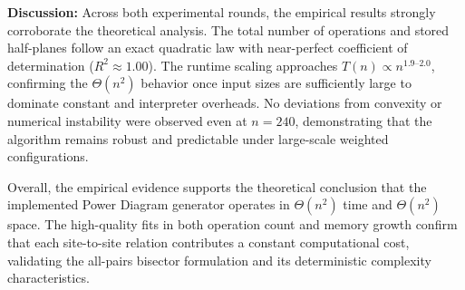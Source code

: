 \documentclass{article}
\begin{document}
\textbf{Discussion:}
Across both experimental rounds, the empirical results strongly corroborate the theoretical analysis.  
The total number of operations and stored half-planes follow an exact quadratic law with near-perfect coefficient of determination ($R^2\!\approx\!1.00$).  
The runtime scaling approaches $T(n)\!\propto\!n^{1.9\text{–}2.0}$, confirming the $\Theta(n^2)$ behavior once input sizes are sufficiently large to dominate constant and interpreter overheads.  
No deviations from convexity or numerical instability were observed even at $n=240$, demonstrating that the algorithm remains robust and predictable under large-scale weighted configurations.

Overall, the empirical evidence supports the theoretical conclusion that the implemented Power Diagram generator operates in $\Theta(n^2)$ time and $\Theta(n^2)$ space.  
The high-quality fits in both operation count and memory growth confirm that each site-to-site relation contributes a constant computational cost, validating the all-pairs bisector formulation and its deterministic complexity characteristics.

\setcounter{Psec}{0}
\setcounter{Psubsec}{0}
\newpage
\end{document}
